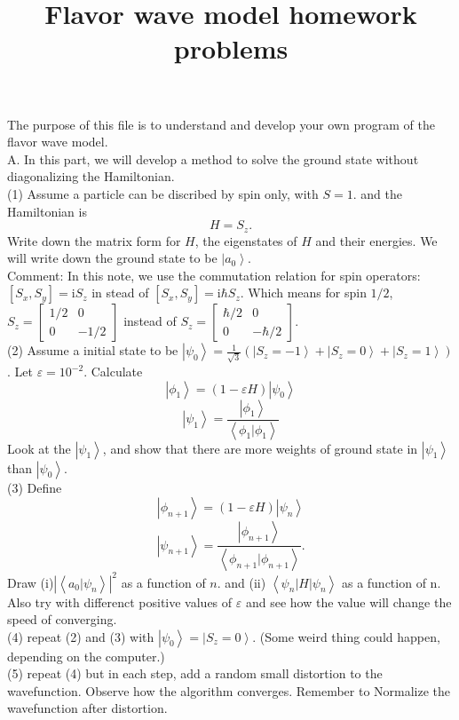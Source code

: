 \documentclass[letter]{article}
\title{{\myfont Flavor wave model homework problems}}
\newcommand{\ii}{\mathrm{i}}
\begin{document}
\maketitle
The purpose of this file is to understand and develop your own program of the flavor wave model.\\
{\large{A}}. In this part, we will develop a method to solve the ground state without diagonalizing the Hamiltonian. \\
\indent (1)  Assume a particle can be discribed by spin only, with $S=1$. and the Hamiltonian is 
$$ H= S_z.
$$
Write down the matrix form for $H$, the eigenstates of $H$ and their energies. We will write down the ground state to be $\left|a_0\right>$.\\
\indent Comment: In this note, we use the commutation relation for spin operators: $[S_x,S_y]=\ii S_z$ in stead of $[S_x,S_y]=\ii \hbar S_z$. Which means for spin $1/2$, $S_z=\begin{bmatrix}
    1/2 & 0 \\
    0 &  -1/2
    \end{bmatrix}$ instead of $ S_z=\begin{bmatrix}
        \hbar/2 & 0 \\
        0 &  -\hbar/2
        \end{bmatrix}$. \\
\indent (2) Assume a initial state to be $\left|\psi_0\right>=\frac{1}{\sqrt{3}}(\left|S_z=-1\right>+\left|S_z=0\right>+\left|S_z=1\right>)$. Let $\varepsilon=10^{-2}$. Calculate 
$$\left|\phi_1\right>=\left(1-\varepsilon H \right)\left|\psi_0\right>$$
$$\left|\psi_1\right>=\frac{\left|\phi_1\right>}{\left<\phi_1|\phi_1\right>}$$
Look at the $\left|\psi_1\right>$, and show that  there are more weights of ground state in $\left|\psi_1\right>$ than $\left|\psi_0\right>$.\\
\indent (3) Define 
$$\left|\phi_{n+1}\right>=\left(1-\varepsilon H\right) \left|\psi_n\right>$$
$$\left|\psi_{n+1}\right>=\frac{\left|\phi_{n+1}\right>}{\left<\phi_{n+1}|\phi_{n+1}\right>}.$$
Draw (i)$\left|\left<a_0|\psi_n\right>\right|^2$ as a function of $n$. and 
(ii) $\left<\psi_n|H|\psi_n\right>$ as a function of n. Also try with differenct positive values of $\varepsilon$ and see how the value will change the speed of converging.\\
\indent (4) repeat (2) and (3) with $\left|\psi_0\right>=\left|S_z=0\right>$. (Some weird thing could happen, depending on the computer.)\\ 
\indent (5) repeat (4) but in each step, add a random small distortion to the wavefunction. Observe how the algorithm converges. Remember to Normalize the wavefunction after distortion. \\ 
\end{document}
